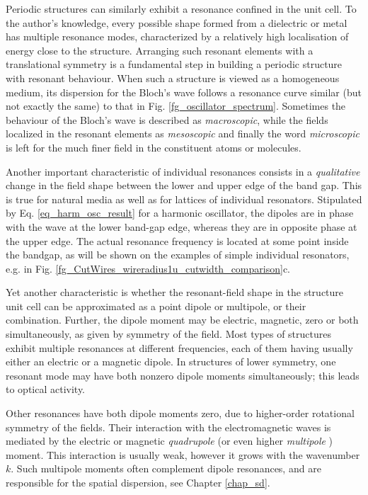 Periodic structures can similarly exhibit a resonance confined in the unit cell. 
To the author's knowledge,  %
every possible shape formed from a dielectric or metal has multiple resonance modes,  %
characterized by a relatively high localisation of energy close to the structure. %
Arranging such resonant elements with a translational symmetry is a fundamental step in building a periodic structure with resonant behaviour. When such a structure is viewed as a homogeneous medium, its dispersion for the Bloch's wave follows a resonance curve similar (but not exactly the same) to that in Fig. \ref{fg_oscillator_spectrum}. Sometimes the behaviour of the Bloch's wave is described as \textit{macroscopic}, while the fields localized in the resonant elements as \textit{mesoscopic} \cite{felbacq2005theory} and finally the word \textit{microscopic} is left for the much finer field in the constituent atoms or molecules.

Another important characteristic of individual resonances consists in a \textit{qualitative} change in the field shape between the lower and upper edge of the band gap. This is true for natural media as well as for lattices of individual resonators. Stipulated by Eq. \ref{eq_harm_osc_result} for a harmonic oscillator, the dipoles are in phase with the wave at the lower band-gap edge, whereas they are in opposite phase at the upper edge.  %
The actual resonance frequency is located at some point inside the bandgap, as will be shown on the examples of simple individual resonators, e.g. in Fig. \ref{fg_CutWires_wireradius1u_cutwidth_comparison}c.

Yet another characteristic is whether the resonant-field shape in the structure unit cell can be approximated as a point dipole or multipole, or their combination. Further, the dipole moment may be electric, magnetic, zero or both simultaneously, as given by symmetry of the field. Most types of structures exhibit multiple resonances at different frequencies, each of them having usually either an electric or a magnetic dipole. In structures of lower symmetry, one resonant mode may have both nonzero dipole moments simultaneously; this leads to optical activity. 

Other resonances have both dipole moments zero, due to higher-order rotational symmetry of the fields. Their interaction with the electromagnetic waves is mediated by the electric or magnetic \textit{quadrupole} (or even higher \textit{multipole} \cite{merlin2009metamaterials}) moment. This interaction is usually weak, however it grows with the wavenumber $k$. Such multipole moments often complement dipole resonances, and are responsible for the spatial dispersion, see Chapter \ref{chap_sd}. %


